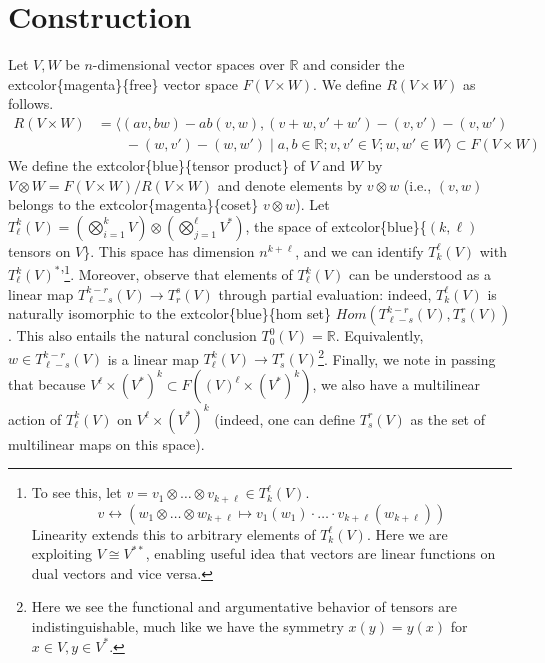 \documentclass[
]{book}
\begin{document}
\hypertarget{construction-4}{%
\section{Construction}\label{construction-4}}

Let \(V,W\) be \(n\)-dimensional vector spaces over \(\mathbb{R}\) and consider the extcolor\{magenta\}\{free\} vector space \(F(V \times W)\). We define \(R(V \times W)\) as follows.\\
\begin{align*} 
    R(V \times W) &= \Big\langle (av,bw) - ab(v,w),  (v + w, v' + w') - (v,v') - (v,w') \\  
    &\qquad - (w,v') - (w,w') \; \Big| \; a,b \in \mathbb{R}; v,v' \in V; w,w' \in W \Big\rangle \subset F(V \times W) 
\end{align*}
We define the extcolor\{blue\}\{tensor product\} of \(V\) and \(W\) by \(V \otimes W = F(V \times W)/R(V \times W)\) and denote elements by \(v \otimes w\) (i.e., \((v,w)\) belongs to the extcolor\{magenta\}\{coset\} \(v \otimes w\)). Let \(T^k_\ell(V) = (\bigotimes_{i=1}^k V) \otimes (\bigotimes_{j=1}^\ell V^*)\), the space of extcolor\{blue\}\{\((k, \ell)\) tensors on \(V\)\}. This space has dimension \(n^{k + \ell}\), and we can identify \(T_k^\ell(V)\) with \(T_\ell^k(V)^*\)'\footnote{To see this, let \(v = v_1 \otimes \dots \otimes v_{k+\ell} \in T_k^\ell(V)\).
  \begin{equation}
  v \leftrightarrow (w_1 \otimes \dots \otimes w_{k+\ell} \mapsto v_1(w_1) \cdot \dotsc \cdot v_{k+\ell}(w_{k+\ell}))
  \end{equation}
  Linearity extends this to arbitrary elements of \(T_k^\ell(V)\). Here we are exploiting \(V \cong V^{**}\), enabling useful idea that vectors are linear functions on dual vectors and vice versa.}. Moreover, observe that elements of \(T^k_\ell(V)\) can be understood as a linear map \(T^{k-r}_{\ell-s}(V) \to T_r^s(V)\) through partial evaluation: indeed, \(T_k^\ell(V)\) is naturally isomorphic to the extcolor\{blue\}\{hom set\} \(Hom(T^{k-r}_{\ell-s}(V), T^r_s(V))\). This also entails the natural conclusion \(T_0^0(V) = \mathbb{R}\). Equivalently, \(w \in T^{k-r}_{\ell-s}(V)\) is a linear map \(T^k_\ell(V) \to T^r_s(V)\)\footnote{Here we see the functional and argumentative behavior of tensors are indistinguishable, much like we have the symmetry \(x(y) = y(x)\) for \(x \in V, y \in V^*\).}. Finally, we note in passing that because \(V^\ell \times (V^*)^k \subset F((V)^\ell \times (V^*)^k)\), we also have a multilinear action of \(T^k_\ell(V)\) on \(V^\ell \times (V^*)^k\) (indeed, one can define \(T^r_s(V)\) as the set of multilinear maps on this space).
\end{document}
